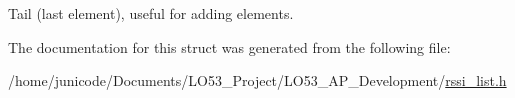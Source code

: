 Tail (last element), useful for adding elements. 



The documentation for this struct was generated from the following file\+:\begin{DoxyCompactItemize}
\item 
/home/junicode/\+Documents/\+L\+O53\+\_\+\+Project/\+L\+O53\+\_\+\+A\+P\+\_\+\+Development/\hyperlink{rssi__list_8h}{rssi\+\_\+list.\+h}\end{DoxyCompactItemize}
